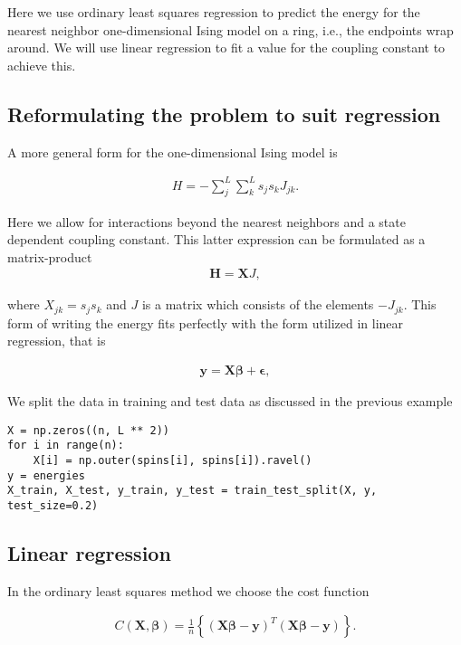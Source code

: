 \documentclass[%
oneside,                 %
final,                   %
10pt]{article}
\begin{document}
Here we use ordinary least squares
regression to predict the energy for the nearest neighbor
one-dimensional Ising model on a ring, i.e., the endpoints wrap
around. We will use linear regression to fit a value for
the coupling constant to achieve this.

\subsection*{Reformulating the problem to suit regression}

A more general form for the one-dimensional Ising model is

\begin{align}
    H = - \sum_j^L \sum_k^L s_j s_k J_{jk}.
\end{align}

Here we allow for interactions beyond the nearest neighbors and a state dependent
coupling constant. This latter expression can be formulated as
a matrix-product
\begin{align}
    \bm{H} = \bm{X} J,
\end{align}

where $X_{jk} = s_j s_k$ and $J$ is a matrix which consists of the
elements $-J_{jk}$. This form of writing the energy fits perfectly
with the form utilized in linear regression, that is

\begin{align}
    \bm{y} = \bm{X}\bm{\beta} + \bm{\epsilon},
\end{align}

We split the data in training and test data as discussed in the previous example

\begin{verbatim}
X = np.zeros((n, L ** 2))
for i in range(n):
    X[i] = np.outer(spins[i], spins[i]).ravel()
y = energies
X_train, X_test, y_train, y_test = train_test_split(X, y, test_size=0.2)
\end{verbatim}

\subsection*{Linear regression}

In the ordinary least squares method we choose the cost function

\begin{align}
    C(\bm{X}, \bm{\beta})= \frac{1}{n}\left\{(\bm{X}\bm{\beta} - \bm{y})^T(\bm{X}\bm{\beta} - \bm{y})\right\}.
\end{align}
\end{document}
